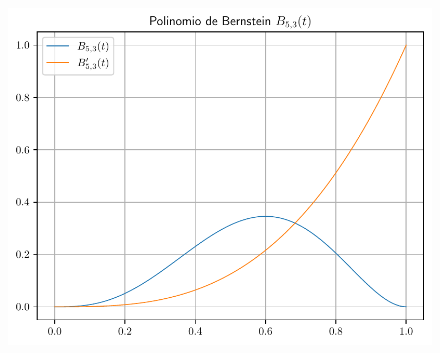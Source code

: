 \begin{frame}
    \begin{solution}
        \begin{figure}[ht!]
            \centering
            \includegraphics[width=.72\paperwidth]{p1}
        \end{figure}
    \end{solution}
\end{frame}